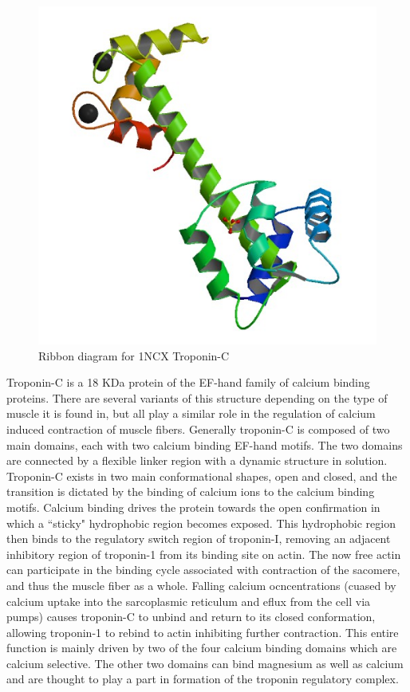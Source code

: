 \documentclass[12pt]{article}
\begin{document}
	\begin{figure}[H]
		\centering
		\includegraphics[width=.55\linewidth]{ncx.png}
		
		\caption{Ribbon diagram for 1NCX Troponin-C\cite{Rao1996}}
		\label{struct}
	\end{figure}
	
	Troponin-C is a 18 KDa  protein of the EF-hand family of calcium binding proteins.\cite{Rao1996} There are several variants of this structure depending on the type of muscle it is found in, but all play a similar role in the regulation of calcium induced contraction of muscle fibers. Generally troponin-C is composed of two main domains, each with two calcium binding EF-hand motifs.\cite{Rao1996,Leavis1978} The two domains are connected by a flexible linker region with a dynamic structure in solution. Troponin-C exists in two main conformational shapes, open and closed, and the transition is dictated by the binding of calcium ions to the calcium binding motifs. Calcium binding drives the protein towards the open confirmation in which a ``sticky" hydrophobic region becomes exposed. This hydrophobic region then binds to the regulatory switch region of troponin-I, removing an adjacent inhibitory region of troponin-1 from its binding site on actin.\cite{Li2015} The now free actin can participate in the binding cycle associated with contraction of the sacomere, and thus the muscle fiber as a whole. Falling calcium ocncentrations (cuased by calcium uptake into the sarcoplasmic reticulum and eflux from the cell via pumps) causes troponin-C to unbind and return to its closed conformation, allowing troponin-1 to rebind to actin inhibiting further contraction.\cite{Bers2002,GDLamb;Society2000} This entire function is mainly driven by two of the four calcium binding domains which are calcium selective. The other two domains can bind magnesium as well as calcium and are thought to play a part in formation of the troponin regulatory complex.\cite{Li2015}
	
\end{document}
